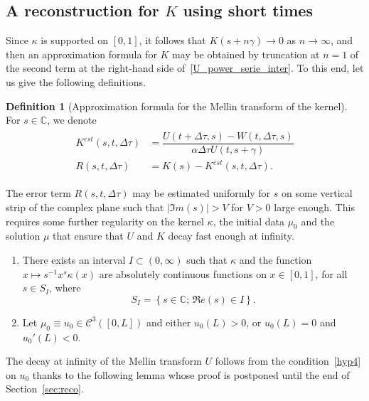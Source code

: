 \documentclass[10pt]{amsart}
\theoremstyle{definition}\newtheorem{defi}[theo]{Definition}\newtheorem{rema}[theo]{Remark}\newtheorem{exam}[theo]{Example}\newtheorem{exem}[theo]{Example}\newtheorem{nota}[theo]{Notation}
\renewcommand*\a{\alpha}
\newcommand*\C{\mathbb{C}}
\newcommand{\clC}{\mathcal{C}}
\newcommand*{\Hypenumi}{\renewcommand*{\theenumi}{\textbf{Hyp-\arabic{enumi}}}}
\begin{document}
\subsection{A reconstruction for \texorpdfstring{$K$}{K} using short times}

Since $\kappa$ is supported on $[0,1]$, it follows that $K(s+n\gamma) \to 0$ as $n\to \infty$, {and then} an approximation formula for $K$ may be obtained by truncation at $n=1$ of the second term at the right-hand side of~\eqref{U_power_serie_inter}. To this end, let us give the following definitions.

\begin{defi}[Approximation formula for the Mellin transform of the kernel]\label{def:Kest}
For $s\in \C$, we denote
\begin{align}\label{reco2}
\begin{split}
 K^{est}(s,t,\Delta \tau) &=\dfrac{U(t+\Delta \tau, s) - W(t,\Delta \tau, s) }{\a \Delta \tau U(t,s+\gamma)} \\
R(s,t,\Delta \tau)&= K(s) - K^{est}(s,t,\Delta \tau). 
\end{split}
\end{align}
\end{defi}

The error term $R(s,t,\Delta \tau)$ may be estimated uniformly for $s$ on some vertical strip of the complex plane such that $|\Im m (s)|>V$ for $V>0$ large enough. This requires some further regularity on the kernel $\kappa $, the initial data $\mu_0$ and the solution $\mu $ that ensure that $U$ and $K$ decay fast enough at infinity.


\begin{enumerate}\Hypenumi
\setcounter{enumi}{2}
\item \label{hyp3}
There exists an interval $I\subset (0, \infty)$ such that $\kappa $ and the function $x\mapsto s^{-1}x^{s}\kappa (x)$ are absolutely continuous functions on $x\in [0, 1]$, for all $s\in S_I$, where
\begin{equation*}
S_I=\left\{s\in \C;\,\Re e(s)\in I \right\}.
\end{equation*}
\item \label{hyp4}
Let $\mu _0\equiv u_0\in \clC^3([0,L])$ and either $u_0(L)>0$, or $u_0(L)=0$ and $u_0'(L)<0$.
\end{enumerate}
The decay at infinity of the Mellin transform $U$ follows from the condition~\eqref{hyp4} on $u_0$ thanks to the following lemma whose proof is postponed until the end of Section~\ref{sec:reco}.
\end{document}
